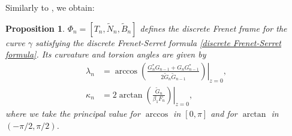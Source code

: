 \documentclass[10pt,leqno]{amsart}
\newtheorem{prop}[theorem]{Proposition}
\numberwithin{equation}{section}
\begin{document}
Similarly to \cite[\S 3]{HIKMO:DLIE}, we obtain:
\begin{prop}\label{prop:curve and frame explicit}
$\Phi_{n}=[T_{n}, \widetilde{N}_{n}, \widetilde{B}_{n}]$
defines the discrete Frenet frame for the curve $\gamma$
satisfying the discrete Frenet-Serret formula \eqref{discrete Frenet-Serret formula}.
Its curvature and torsion angles are given by
\begin{align}\label{lam}
\lambda_n&=\left.\arccos\left(\frac{G_{n}^{*}G_{n-1}+G_{n}G_{n-1}^{*}}{2\widetilde{G}_{n}\widetilde{G}_{n-1}}\right)\right|_{z=0}, \\
\kappa_{n}&=\left.2\arctan\left(\frac{\widetilde{G}_{n}}{\beta_{1} F_{n}}\right)\right|_{z=0}, \nonumber
\end{align}
where we take the principal value for $\arccos$ in $[0, \pi]$ and for $\arctan$ in $(-\pi/2, \pi/2)$.
\end{prop}
\end{document}
